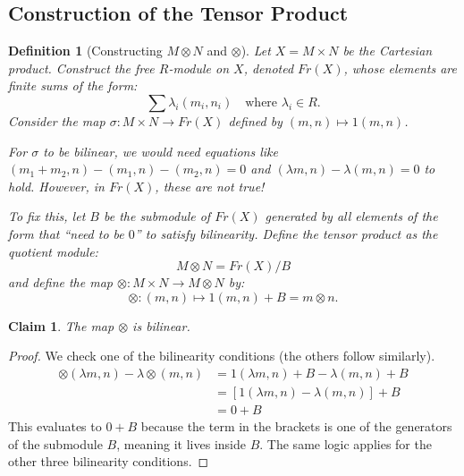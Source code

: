 \documentclass[a4paper,12pt]{article}
\newtheorem{defn}[thm]{Definition}
\newtheorem{claim}[thm]{Claim}
\begin{document}
\subsection{Construction of the Tensor Product}

\begin{defn}[Constructing $M \otimes N$ and $\otimes$]
    Let $X = M \times N$ be the Cartesian product. Construct the free $R$-module on $X$, denoted $Fr(X)$, whose elements are finite sums of the form:
    \[ \sum \lambda_i (m_i, n_i) \quad \text{where } \lambda_i \in R. \]
    Consider the map $\sigma: M \times N \to Fr(X)$ defined by $(m,n) \mapsto 1(m,n)$. 
    
    For $\sigma$ to be bilinear, we would need equations like $(m_1+m_2, n) - (m_1, n) - (m_2, n) = 0$ and $(\lambda m, n) - \lambda(m, n) = 0$ to hold. However, in $Fr(X)$, these are \emph{not} true! 
    
    To fix this, let $B$ be the submodule of $Fr(X)$ generated by all elements of the form that ``need to be $0$'' to satisfy bilinearity. Define the tensor product as the quotient module:
    \[ M \otimes N = Fr(X)/B \]
    and define the map $\otimes: M \times N \to M \otimes N$ by:
    \[ \otimes: (m,n) \mapsto 1(m,n) + B = m \otimes n. \]
\end{defn}

\begin{claim}
    The map $\otimes$ is bilinear.
\end{claim}
\begin{proof}
    We check one of the bilinearity conditions (the others follow similarly).
    \begin{align*}
        \otimes(\lambda m, n) - \lambda \otimes(m,n) &= 1(\lambda m, n) + B - \lambda(m,n) + B \\
        &= [1(\lambda m, n) - \lambda(m,n)] + B \\
        &= 0 + B
    \end{align*}
    This evaluates to $0 + B$ because the term in the brackets is one of the generators of the submodule $B$, meaning it lives inside $B$. The same logic applies for the other three bilinearity conditions.
\end{proof}
\end{document}

